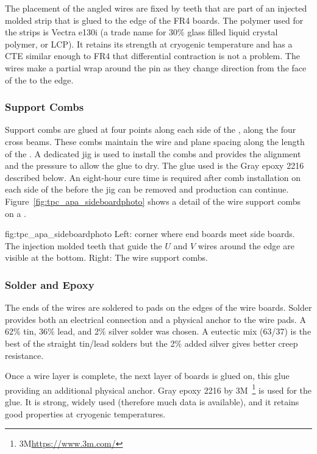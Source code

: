 The placement of the angled wires are fixed by teeth that are part of an injected molded strip that is glued to the edge of the FR4 boards.  The polymer used for the strips is Vectra e130i (a trade name for 30$\%$ glass filled liquid crystal polymer, or LCP). It retains its strength at cryogenic temperature and has a CTE similar enough to FR4 that differential contraction is not a problem.  The wires make a partial wrap around the pin as they change direction from the face of the  to the edge.

\subsubsection{Support Combs}
\label{sec:combs}

Support combs are glued at four points along each side of the , along the four cross beams. These combs maintain the wire and plane spacing along the length of the . A dedicated jig is used to install the combs and provides the alignment and the pressure to allow the glue to dry. The glue used is the Gray epoxy \num{2216} described below. An eight-hour cure time is required after comb installation on each side of the  before the jig can be removed and production can continue.  Figure~\ref{fig:tpc_apa_sideboardphoto} shows a detail of the wire support combs on a  .

\begin{dunefigure}{fig:tpc_apa_sideboardphoto}
{Left:  corner where end boards meet side boards.  The injection molded teeth that guide the $U$ and $V$ wires around the edge are visible at the bottom. Right: The wire support combs.}
\setlength{\fboxsep}{0pt}
\setlength{\fboxrule}{0.5pt}
\quad
{}
\end{dunefigure}

\subsubsection{Solder and Epoxy}
\label{sec:glue-solder}

The ends of the wires are soldered to pads on the edges of the wire boards.  Solder provides both an electrical connection and a physical anchor to the wire pads. A 62$\%$ tin, 36$\%$ lead, and 2$\%$ silver solder was chosen.  A eutectic mix (63/37) is the best of the straight tin/lead 
 solders but the 2$\%$ added silver gives better creep resistance. 

Once a wire layer is complete, the next layer of boards is glued on, this glue providing an additional physical anchor. Gray epoxy \num{2216} by 3M~\footnote{3M\texttrademark \url{https://www.3m.com/}} is used for the glue.  It is strong, widely used (therefore much data is available), and it retains good properties at cryogenic temperatures.  

